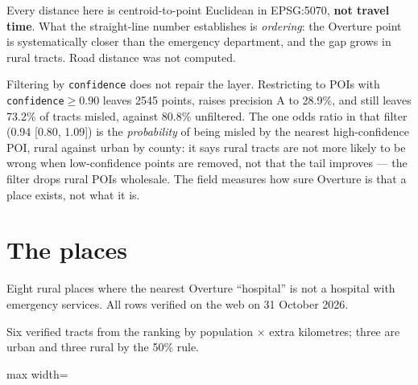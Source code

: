 \documentclass[a4paper]{article}
\begin{document}
\noindent Every distance here is centroid-to-point Euclidean in EPSG:5070, \textbf{not travel time}. What the
straight-line number establishes is \emph{ordering}: the Overture point is systematically closer than the
emergency department, and the gap grows in rural tracts. Road distance was not computed.

Filtering by \texttt{confidence} does not repair the layer. Restricting to POIs with
\texttt{confidence}$\ge0.90$ leaves \num{2545} points, raises precision A to 28.9\%, and still
leaves 73.2\% of tracts misled, against 80.8\% unfiltered. The one odds ratio in that filter
(0.94 [0.80, 1.09]) is the \emph{probability} of being misled by the nearest high-confidence
POI, rural against urban by county: it says rural tracts are not more likely to be wrong when
low-confidence points are removed, not that the tail improves --- the filter drops rural POIs
wholesale. The field measures how sure Overture is that a place exists, not what it is.

\section{The places}

\begin{table}[htbp]
\centering
\caption{Eight rural places where the nearest Overture ``hospital'' is not a hospital with
emergency services. All rows verified on the web on 31 October 2026.}
\label{tab:rural}
\makeatletter
{}
\makeatother
{}
\end{table}

\begin{table}[htbp]
\centering
\caption{Six verified tracts from the ranking by population $\times$ extra kilometres; three are
urban and three rural by the 50\% rule.}
\label{tab:urban}
\begin{adjustbox}{max width=\textwidth}

\end{adjustbox}
\end{table}
\end{document}
